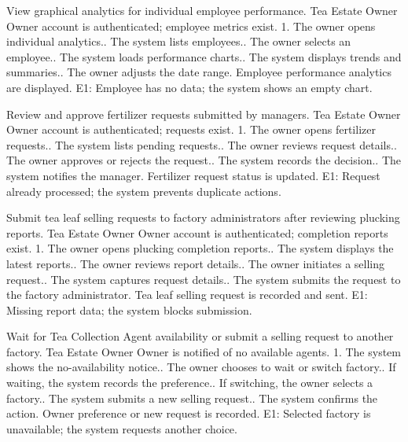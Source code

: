 {View graphical analytics for individual employee performance.}
{Tea Estate Owner}
{Owner account is authenticated; employee metrics exist.}
{1. The owner opens individual analytics.. The system lists employees.. The owner selects an employee.. The system loads performance charts.. The system displays trends and summaries.. The owner adjusts the date range.}
{Employee performance analytics are displayed.}
{E1: Employee has no data; the system shows an empty chart.}

{Review and approve fertilizer requests submitted by managers.}
{Tea Estate Owner}
{Owner account is authenticated; requests exist.}
{1. The owner opens fertilizer requests.. The system lists pending requests.. The owner reviews request details.. The owner approves or rejects the request.. The system records the decision.. The system notifies the manager.}
{Fertilizer request status is updated.}
{E1: Request already processed; the system prevents duplicate actions.}

{Submit tea leaf selling requests to factory administrators after reviewing plucking reports.}
{Tea Estate Owner}
{Owner account is authenticated; completion reports exist.}
{1. The owner opens plucking completion reports.. The system displays the latest reports.. The owner reviews report details.. The owner initiates a selling request.. The system captures request details.. The system submits the request to the factory administrator.}
{Tea leaf selling request is recorded and sent.}
{E1: Missing report data; the system blocks submission.}

{Wait for Tea Collection Agent availability or submit a selling request to another factory.}
{Tea Estate Owner}
{Owner is notified of no available agents.}
{1. The system shows the no-availability notice.. The owner chooses to wait or switch factory.. If waiting, the system records the preference.. If switching, the owner selects a factory.. The system submits a new selling request.. The system confirms the action.}
{Owner preference or new request is recorded.}
{E1: Selected factory is unavailable; the system requests another choice.}

